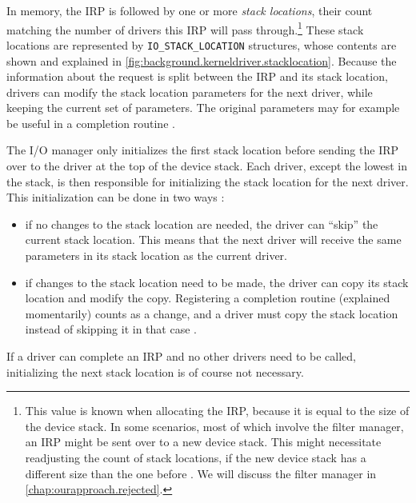 In memory, the IRP is followed by one or more \emph{stack locations}, their count matching the number of drivers this IRP will pass through.\footnote{\label{fn:background.kerneldriver.adjuststacksize} This value is known when allocating the IRP, because it is equal to the size of the device stack. In some scenarios, most of which involve the filter manager, an IRP might be sent over to a new device stack. This might necessitate readjusting the count of stack locations, if the new device stack has a different size than the one before \cite{Yosifovich2017}. We will discuss the filter manager in \autoref{chap:ourapproach.rejected}.} These stack locations are represented by \texttt{IO\_STACK\_LOCATION} structures, whose contents are shown and explained in \autoref{fig:background.kerneldriver.stacklocation}. Because the information about the request is split between the IRP and its stack location, drivers can modify the stack location parameters for the next driver, while keeping the current set of parameters. The original parameters may for example be useful in a completion routine \cite{Yosifovich2017}.

The I/O manager only initializes the first stack location before sending the IRP over to the driver at the top of the device stack. Each driver, except the lowest in the stack, is then responsible for initializing the stack location for the next driver. This initialization can be done in two ways \cite{Yosifovich2017}:
\begin{itemize}
	\item if no changes to the stack location are needed, the driver can ``skip'' the current stack location. This means that the next driver will receive the same parameters in its stack location as the current driver.
	\item if changes to the stack location need to be made, the driver can copy its stack location and modify the copy. Registering a completion routine (explained momentarily) counts as a change, and a driver must copy the stack location instead of skipping it in that case \cite{Wdk}.
\end{itemize}
If a driver can complete an IRP and no other drivers need to be called, initializing the next stack location is of course not necessary.

